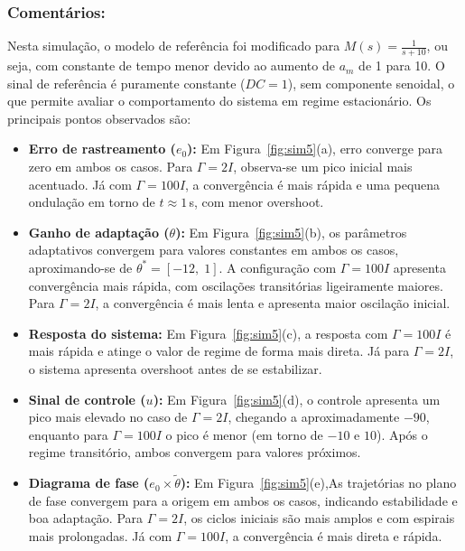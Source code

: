 \documentclass[10pt]{article}
\begin{document}
\subsubsection{Comentários:}

Nesta simulação, o modelo de referência foi modificado para $M(s) = \frac{1}{s+10}$, ou seja, com constante de tempo menor devido ao aumento de $a_m$ de 1 para 10. O sinal de referência é puramente constante ($DC = 1$), sem componente senoidal, o que permite avaliar o comportamento do sistema em regime estacionário. Os principais pontos observados são:

\begin{itemize}
    \item \textbf{Erro de rastreamento ($e_0$):} Em Figura~\ref{fig:sim5}(a),  erro converge para zero em ambos os casos. Para $\Gamma = 2I$, observa-se um pico inicial mais acentuado. Já com $\Gamma = 100I$, a convergência é mais rápida e uma pequena ondulação em torno de $t \approx 1\,$s, com menor overshoot.

    \item \textbf{Ganho de adaptação ($\theta$):} Em Figura~\ref{fig:sim5}(b), os parâmetros adaptativos convergem para valores constantes em ambos os casos, aproximando-se de $\theta^* = [-12,\;1]$. A configuração com $\Gamma = 100I$ apresenta convergência mais rápida, com oscilações transitórias ligeiramente maiores. Para $\Gamma = 2I$, a convergência é mais lenta e apresenta maior oscilação inicial.

    \item \textbf{Resposta do sistema:} Em Figura~\ref{fig:sim5}(c), a resposta com $\Gamma = 100I$ é mais rápida e atinge o valor de regime de forma mais direta. Já para $\Gamma = 2I$, o sistema apresenta overshoot antes de se estabilizar.

    \item \textbf{Sinal de controle ($u$):} Em Figura~\ref{fig:sim5}(d), o controle apresenta um pico mais elevado no caso de $\Gamma = 2I$, chegando a aproximadamente $-90$, enquanto para $\Gamma = 100I$ o pico é menor (em torno de $-10$ e $10$). Após o regime transitório, ambos convergem para valores próximos.

    \item \textbf{Diagrama de fase ($e_0 \times \tilde{\theta}$):} Em Figura~\ref{fig:sim5}(e),As trajetórias no plano de fase convergem para a origem em ambos os casos, indicando estabilidade e boa adaptação. Para $\Gamma = 2I$, os ciclos iniciais são mais amplos e com espirais mais prolongadas. Já com $\Gamma = 100I$, a convergência é mais direta e rápida.

\end{itemize}
\end{document}
